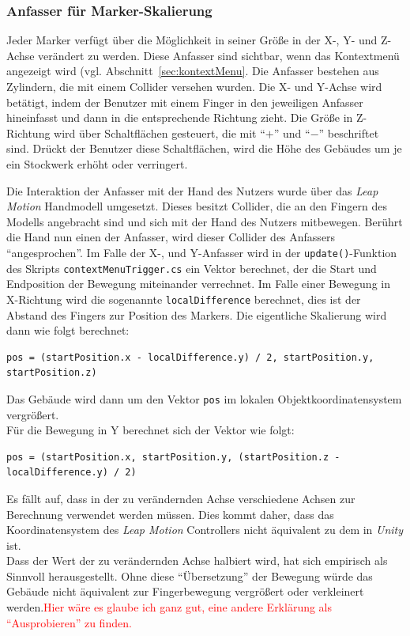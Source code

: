 \subsubsection{Anfasser für Marker-Skalierung}\label{sec:markerHandles}
Jeder Marker verfügt über die Möglichkeit in seiner Größe in der X-, Y- und Z-Achse verändert zu werden. Diese Anfasser sind sichtbar, wenn das Kontextmenü angezeigt wird (vgl. Abschnitt~\ref{sec:kontextMenu}. Die Anfasser bestehen aus Zylindern, die mit einem Collider versehen wurden. Die X- und Y-Achse wird betätigt, indem der Benutzer mit einem Finger in den jeweiligen Anfasser hineinfasst und dann in die entsprechende Richtung zieht. Die Größe in Z-Richtung wird über Schaltflächen gesteuert, die mit "`$+$"' und "`$-$"' beschriftet sind. Drückt der Benutzer diese Schaltflächen, wird die Höhe des Gebäudes um je ein Stockwerk erhöht oder verringert.

Die Interaktion der Anfasser mit der Hand des Nutzers wurde über das \emph{Leap Motion} Handmodell umgesetzt. Dieses besitzt Collider, die an den Fingern des Modells angebracht sind und sich mit der Hand des Nutzers mitbewegen. Berührt die Hand nun einen der Anfasser, wird dieser Collider des Anfassers "`angesprochen"'. Im Falle der X-, und Y-Anfasser wird in der \texttt{update()}-Funktion des Skripts \texttt{contextMenuTrigger.cs} ein Vektor berechnet, der die Start und Endposition der Bewegung miteinander verrechnet. Im Falle einer Bewegung in X-Richtung wird die sogenannte \texttt{localDifference} berechnet, dies ist der Abstand des Fingers zur Position des Markers. Die eigentliche Skalierung wird dann wie folgt berechnet:

 \begin{lstlisting}
pos = (startPosition.x - localDifference.y) / 2, startPosition.y, startPosition.z)
 \end{lstlisting}

Das Gebäude wird dann um den Vektor \texttt{pos} im lokalen Objektkoordinatensystem vergrößert.\\
Für die Bewegung in Y berechnet sich der Vektor wie folgt:

 \begin{lstlisting}
pos = (startPosition.x, startPosition.y, (startPosition.z - localDifference.y) / 2)
 \end{lstlisting}

Es fällt auf, dass in der zu verändernden Achse verschiedene Achsen zur Berechnung verwendet werden müssen. Dies kommt daher, dass das Koordinatensystem des \emph{Leap Motion} Controllers nicht äquivalent zu dem in \emph{Unity} ist.\\
Dass der Wert der zu verändernden Achse halbiert wird, hat sich empirisch als Sinnvoll herausgestellt. Ohne diese "`Übersetzung"' der Bewegung würde das Gebäude nicht äquivalent zur Fingerbewegung vergrößert oder verkleinert werden.\textcolor{red}{Hier wäre es glaube ich ganz gut, eine andere Erklärung als "`Ausprobieren"' zu finden.}

